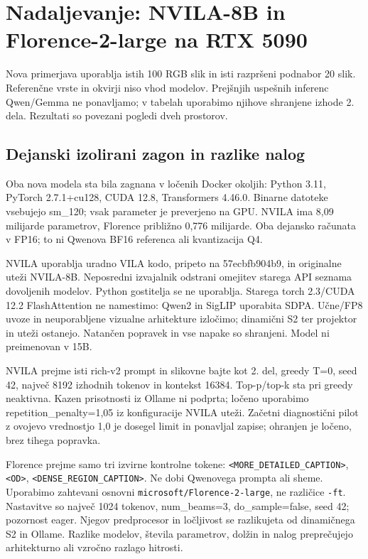 \section*{Nadaljevanje: NVILA-8B in Florence-2-large na RTX 5090}
Nova primerjava uporablja istih 100 RGB slik in isti razpršeni podnabor 20 slik. Referenčne vrste in okvirji niso vhod modelov. Prejšnjih uspešnih inferenc Qwen/Gemma ne ponavljamo; v tabelah uporabimo njihove shranjene izhode 2. dela. Rezultati so povezani pogledi dveh prostorov.
\subsection*{Dejanski izolirani zagon in razlike nalog}
Oba nova modela sta bila zagnana v ločenih Docker okoljih: Python 3.11, PyTorch 2.7.1+cu128, CUDA 12.8, Transformers 4.46.0. Binarne datoteke vsebujejo sm\_120; vsak parameter je preverjeno na GPU. NVILA ima 8,09 milijarde parametrov, Florence približno 0,776 milijarde. Oba dejansko računata v FP16; to ni Qwenova BF16 referenca ali kvantizacija Q4.

NVILA uporablja uradno VILA kodo, pripeto na 57ecbfb904b9, in originalne uteži NVILA-8B. Neposredni izvajalnik odstrani omejitev starega API seznama dovoljenih modelov. Python gostitelja se ne uporablja. Starega torch 2.3/CUDA 12.2 FlashAttention ne namestimo: Qwen2 in SigLIP uporabita SDPA. Učne/FP8 uvoze in neuporabljene vizualne arhitekture izločimo; dinamični S2 ter projektor in uteži ostanejo. Natančen popravek in vse napake so shranjeni. Model ni preimenovan v 15B.

NVILA prejme isti rich-v2 prompt in slikovne bajte kot 2. del, greedy T=0, seed 42, največ 8192 izhodnih tokenov in kontekst 16384. Top-p/top-k sta pri greedy neaktivna. Kazen prisotnosti iz Ollame ni podprta; ločeno uporabimo repetition\_penalty=1,05 iz konfiguracije NVILA uteži. Začetni diagnostični pilot z ovojevo vrednostjo 1,0 je dosegel limit in ponavljal zapise; ohranjen je ločeno, brez tihega popravka.

Florence prejme samo tri izvirne kontrolne tokene: \texttt{<MORE\_DETAILED\_CAPTION>}, \texttt{<OD>}, \texttt{<DENSE\_REGION\_CAPTION>}. Ne dobi Qwenovega prompta ali sheme. Uporabimo zahtevani osnovni \texttt{microsoft/Florence-2-large}, ne različice \texttt{-ft}. Nastavitve so največ 1024 tokenov, num\_beams=3, do\_sample=false, seed 42; pozornost eager. Njegov predprocesor in ločljivost se razlikujeta od dinamičnega S2 in Ollame. Razlike modelov, števila parametrov, dolžin in nalog preprečujejo arhitekturno ali vzročno razlago hitrosti.
